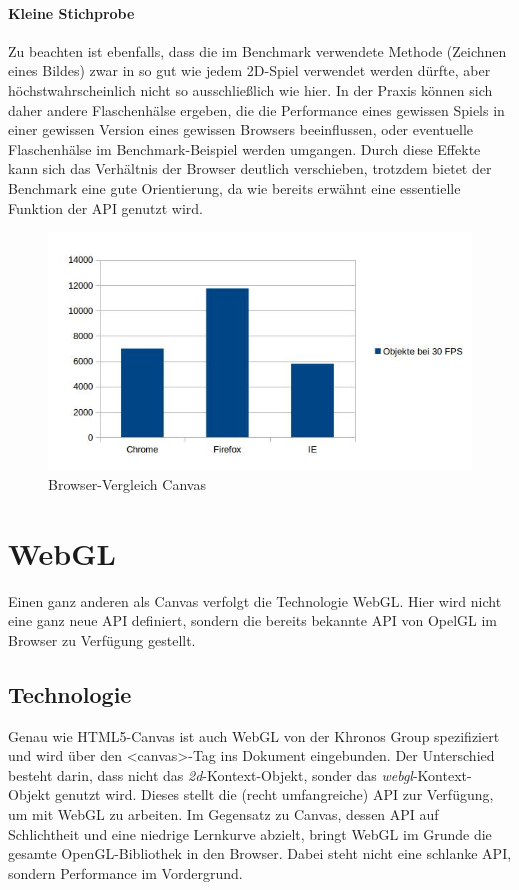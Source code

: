 \documentclass[a4paper, 12pt]{article}
\begin{document}
\paragraph{Kleine Stichprobe} Zu beachten ist ebenfalls, dass die im Benchmark verwendete Methode (Zeichnen eines Bildes) zwar in so gut wie jedem 2D-Spiel verwendet werden dürfte, aber höchstwahrscheinlich nicht so ausschließlich wie hier. In der Praxis können sich daher andere Flaschenhälse ergeben, die die Performance eines gewissen Spiels in einer gewissen Version eines gewissen Browsers beeinflussen, oder eventuelle Flaschenhälse im Benchmark-Beispiel werden umgangen. Durch diese Effekte kann sich das Verhältnis der Browser deutlich verschieben, trotzdem bietet der Benchmark eine gute Orientierung, da wie bereits erwähnt eine essentielle Funktion der API genutzt wird.
\begin{figure}[H]
	\includegraphics[width=\textwidth]{assets/browser_comp_canvas} 
	\caption{Browser-Vergleich Canvas}
	\label{browser_comp_canvas}
\end{figure}
\newpage
\section{WebGL}
Einen ganz anderen als Canvas verfolgt die Technologie WebGL. Hier wird nicht eine ganz neue API definiert, sondern die bereits bekannte API von OpelGL im Browser zu Verfügung gestellt.
\subsection{Technologie}
Genau wie HTML5-Canvas ist auch WebGL von der Khronos Group spezifiziert und wird über den <canvas>-Tag ins Dokument eingebunden. Der Unterschied besteht darin, dass nicht das \emph{2d}-Kontext-Objekt, sonder das \emph{webgl}-Kontext-Objekt genutzt wird. Dieses stellt die (recht umfangreiche) API zur Verfügung, um mit WebGL zu arbeiten. Im Gegensatz zu Canvas, dessen API auf Schlichtheit und eine niedrige Lernkurve abzielt, bringt WebGL im Grunde die gesamte OpenGL-Bibliothek in den Browser. Dabei steht nicht eine schlanke API, sondern Performance im Vordergrund.
\end{document}
